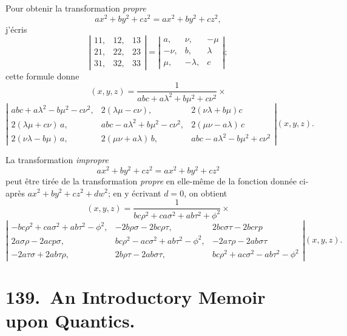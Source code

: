 \documentclass[11pt,a4paper]{article}
\begin{document}
\medskip

Pour obtenir la transformation \textit{propre}
\[
ax^2 + by^2 + cz^2 = ax^2 + by^2 + cz^2,
\]
j'\'ecris
\[
\left\lvert\begin{array}{ccc}
11, & 12, & 13\\
21, & 22, & 23\\
31, & 32, & 33
\end{array}\right\rvert =
\left\lvert\begin{array}{ccc}
a, & \nu, & -\mu\\
-\nu, & b, & \lambda\\
\mu, & -\lambda, & c
\end{array}\right\rvert ;
\]
cette formule donne
\[
(x, y, z) = \frac{1}{abc + a\lambda^2 + b\mu^2 + c\nu^2}\times
\]
\[
\left\lvert\begin{array}{ccc}
abc + a\lambda^2 - b\mu^2 - c\nu^2, & 2(\lambda\mu - c\nu), & 2(\nu\lambda + b\mu) c\\
2(\lambda\mu + c\nu)\,a, & abc - a\lambda^2 + b\mu^2 - c\nu^2, & 2(\mu\nu - a\lambda)\,c\\
2(\nu\lambda - b\mu)\,a, & 2(\mu\nu + a\lambda)\,b, & abc - a\lambda^2 - b\mu^2 + c\nu^2
\end{array}\right\rvert (x, y, z).
\]

\medskip

La transformation \textit{impropre}
\[
ax^2 + by^2 + cz^2 = ax^2 + by^2 + cz^2
\]
peut \^etre tir\'ee de la transformation \textit{propre} en elle-m\^eme de la fonction donn\'ee ci-apr\`es $ax^2 + by^2 + cz^2 + dw^2$; en y \'ecrivant $d = 0$, on obtient
\[
(x, y, z) = \frac{1}{bc\rho^2 + ca\sigma^2 + ab\tau^2 + \phi^2}\times
\]
\[
\left\lvert\begin{array}{ccc}
-bc\rho^2 + ca\sigma^2 + ab\tau^2 - \phi^2, & -2b\rho\sigma - 2bc\rho\tau, & 2bc\sigma\tau - 2bcrp\\
2a\sigma\rho - 2acp\sigma, & bc\rho^2 - ac\sigma^2 + ab\tau^2 - \phi^2, & -2a\tau\rho - 2ab\sigma\tau\\
-2a\tau\sigma + 2ab\tau\rho, & 2b\rho\tau - 2ab\sigma\tau, & bc\rho^2 + ac\sigma^2 - ab\tau^2 - \phi^2
\end{array}\right\rvert (x, y, z).
\]

\medskip

\section*{139.\ An Introductory Memoir upon Quantics.}
\end{document}

